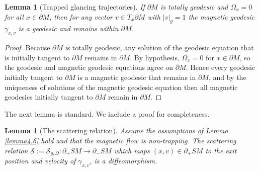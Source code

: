 \documentclass[12pt]{amsart}
\numberwithin{equation}{section}
\newtheorem{lemma}[theorem]{Lemma}
\begin{document}
\begin{lemma}[Trapped glancing trajectories] \label{lem:trapped}
If $\partial M$ is totally geodesic and $\Omega_x=0$ for all $x\in\partial M$, then for any vector $v \in T_x \partial M$ with $|v|_g = 1$ the magnetic geodesic $\gamma_{x,v}$ is a geodesic and remains within $\partial M$.\label{lemma4.6}
\end{lemma}

\begin{proof}
Because $\partial M$ is totally geodesic, any solution of the geodesic equation that is initially tangent to $\partial M$ remains in $\partial M$. By hypothesis, $\Omega_x=0$ for $x\in\partial M$, so the geodesic and magnetic geodesic equations agree on $\partial M$. Hence every geodesic initially tangent to $\partial M$ is a magnetic geodesic that remains in $\partial M$, and by the uniqueness of solutions of the magnetic geodesic equation then all magnetic geodesics initially tangent to $\partial M$ remain in $\partial M$.
\end{proof}

The next lemma is standard. We include a proof for completeness.

\begin{lemma}[The scattering relation] \label{lem:scattering}
Assume the assumptions of Lemma \ref{lemma4.6} hold and that the magnetic flow is non-trapping. The scattering relation $\mathcal S:=\mathcal{S}_{g,\Omega}: \partial_+ SM \to \partial_- SM$ which maps $(x,v)\in\partial_+SM$ to the exit position and velocity of $\gamma_{x,v}$, is a diffeomorphism.\label{lemma4.7}
\end{lemma}
\end{document}
